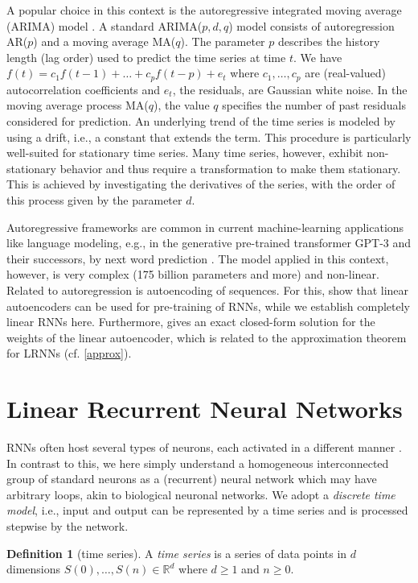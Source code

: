 \documentclass[twoside,11pt]{article}
\theoremstyle{definition}
\newtheorem{defn}{Definition}
\begin{document}
A popular choice in this context is the autoregressive integrated moving average
(ARIMA) model \citep{HK08,HA13}. A standard ARIMA($p,d,q$) model consists of
autoregression AR($p$) and a moving average MA($q$). The parameter $p$ describes
the history length (lag order) used to predict the time series at time $t$. We
have $f(t) = c_1 f(t-1) + \dots + c_p f(t-p) + e_t$ where $c_1,\dots,c_p$ are
(real-valued) autocorrelation coefficients and $e_t$, the residuals, are
Gaussian white noise. In the moving average process MA($q$), the value $q$
specifies the number of past residuals considered for prediction. An underlying
trend of the time series is modeled by using a drift, i.e., a constant that extends
the term. This procedure is particularly well-suited for stationary time series.
Many time series, however, exhibit non-stationary behavior and thus require a
transformation to make them stationary. This is achieved by investigating the
derivatives of the series, with the order of this process given by the parameter
$d$.

Autoregressive frameworks are common in current machine-learning applications
like language modeling, e.g., in the generative pre-trained transformer GPT-3 and their successors,
by next word prediction \citep{BM+20}. The model applied in this context,
however, is very complex (175 billion parameters and more) and non-linear.
Related to autoregression is autoencoding of sequences. For this, \citet{PS14}
show that linear autoencoders can be used for pre-training of RNNs, while we
establish completely linear RNNs here. Furthermore, \citet{Spe06} gives an
exact closed-form solution for the weights of the linear autoencoder, which is
related to the approximation theorem for LRNNs (cf. \cref{approx}).

\section{Linear Recurrent Neural Networks}\label{define}

RNNs often host several types of neurons, each activated in a different manner
\citep{Elm90,HS97}. In contrast to this, we here simply understand a homogeneous
interconnected group of standard neurons as a (recurrent) neural network which may have
arbitrary loops, akin to biological neuronal networks. We adopt a \emph{discrete
time model}, i.e., input and output can be represented by a time series and is
processed stepwise by the network.

\begin{defn}[time series]
A \emph{time series} is a series of data points in $d$ dimensions
$S(0),\dots,S(n) \in \mathbb{R}^d$ where $d \ge 1$ and $n \ge 0$.
\end{defn}
\end{document}
